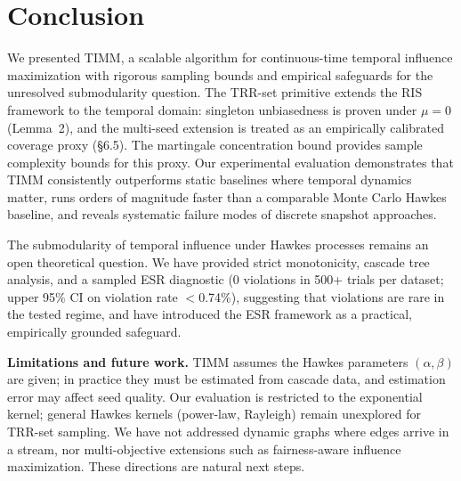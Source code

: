 \documentclass[10pt,conference]{IEEEtran}
\newcommand{\tiimm}{TIMM\xspace}
\begin{document}
\section{Conclusion}

We presented \tiimm{}, a scalable algorithm for continuous-time temporal influence maximization with rigorous sampling bounds and empirical safeguards for the unresolved submodularity question.
The TRR-set primitive extends the RIS framework to the temporal domain: singleton unbiasedness is proven under $\mu{=}0$ (Lemma~2), and the multi-seed extension is treated as an empirically calibrated coverage proxy (\S6.5). The martingale concentration bound provides sample complexity bounds for this proxy.
Our experimental evaluation demonstrates that \tiimm{} consistently outperforms static baselines where temporal dynamics matter, runs orders of magnitude faster than a comparable Monte Carlo Hawkes baseline, and reveals systematic failure modes of discrete snapshot approaches.

The submodularity of temporal influence under Hawkes processes remains an open theoretical question.
We have provided strict monotonicity, cascade tree analysis, and a sampled ESR diagnostic (0 violations in 500+ trials per dataset; upper 95\% CI on violation rate $<$0.74\%), suggesting that violations are rare in the tested regime, and have introduced the ESR framework as a practical, empirically grounded safeguard.

\textbf{Limitations and future work.}
\tiimm{} assumes the Hawkes parameters $(\alpha, \beta)$ are given; in practice they must be estimated from cascade data, and estimation error may affect seed quality.
Our evaluation is restricted to the exponential kernel; general Hawkes kernels (power-law, Rayleigh) remain unexplored for TRR-set sampling.
We have not addressed dynamic graphs where edges arrive in a stream, nor multi-objective extensions such as fairness-aware influence maximization.
These directions are natural next steps.

\end{document}

